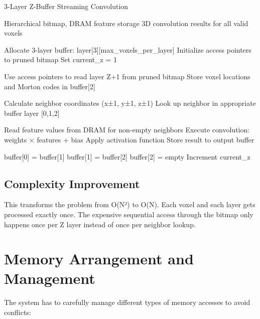 \documentclass[12pt]{article}
\begin{document}
\begin{algorithm}[H]
\caption{3-Layer Z-Buffer Streaming Convolution}
\begin{algorithmic}
\REQUIRE Hierarchical bitmap, DRAM feature storage
\ENSURE 3D convolution results for all valid voxels

\STATE Allocate 3-layer buffer: layer[3][max\_voxels\_per\_layer]
\STATE Initialize access pointers to pruned bitmap
\STATE Set current\_z = 1

    
    \STATE Use access pointers to read layer Z+1 from pruned bitmap
    \STATE Store voxel locations and Morton codes in buffer[2]
    
        
            \STATE Calculate neighbor coordinates (x±1, y±1, z±1)
            \STATE Look up neighbor in appropriate buffer layer [0,1,2]
        \ENDFOR
        
        \STATE Read feature values from DRAM for non-empty neighbors
        \STATE Execute convolution: weights × features + bias
        \STATE Apply activation function
        \STATE Store result to output buffer
        
    \ENDFOR
    
    \STATE buffer[0] = buffer[1]
    \STATE buffer[1] = buffer[2] 
    \STATE buffer[2] = empty
    \STATE Increment current\_z
    
\ENDFOR
\end{algorithmic}
\end{algorithm}

\subsection{Complexity Improvement}

This transforms the problem from O(N²) to O(N). Each voxel and each layer gets processed exactly once. The expensive sequential access through the bitmap only happens once per Z layer instead of once per neighbor lookup.

\section{Memory Arrangement and Management}

The system has to carefully manage different types of memory accesses to avoid conflicts:
\end{document}
